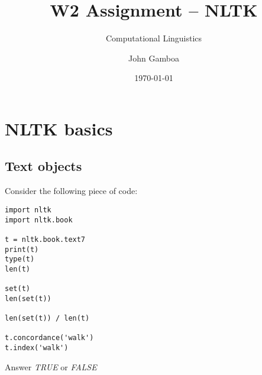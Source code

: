 \documentclass[a4paper,11pt]{scrartcl}
\title{W2 Assignment -- NLTK}
\subtitle{Computational Linguistics}
\author{John Gamboa}
\date{\today}
\begin{document}
\maketitle

\section{NLTK basics}

\subsection{Text objects}

Consider the following piece of code:

{\singlespacing
\begin{verbatim}
import nltk
import nltk.book

t = nltk.book.text7
print(t)
type(t)
len(t)

set(t)
len(set(t))

len(set(t)) / len(t)

t.concordance('walk')
t.index('walk')
\end{verbatim}
}

Answer \textit{TRUE} or \textit{FALSE}
\end{document}
